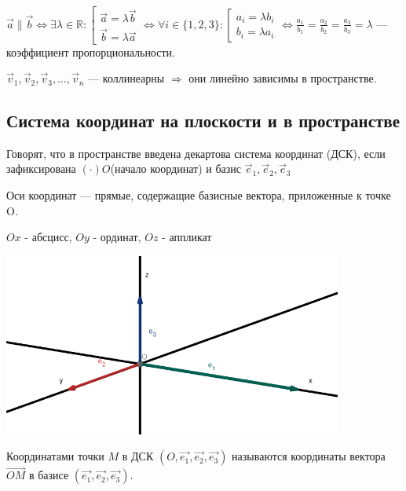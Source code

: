 \(\vec a \parallel \vec b \Leftrightarrow \exists \lambda \in \mathbb{R}:
\left[
\begin{array}{ll}
    \vec a = \lambda \vec b \\
    \vec b = \lambda \vec a
\end{array}
\right .
\Leftrightarrow
\forall i \in \{1, 2, 3\}:
\left[
\begin{array}{ll}
    a_i = \lambda b_i \\
    b_i = \lambda a_i
\end{array}
\right .
\Leftrightarrow \frac{a_1}{b_1} = \frac{a_2}{b_2} = \frac{a_3}{b_3} = \lambda\) --- коэффициент пропорциональности.

\(\vec v_1, \vec v_2, \vec v_3, \dots, \vec v_n\) --- коллинеарны \(\Rightarrow\) они линейно зависимы в пространстве.

\newpage

\subsection{Система координат на плоскости и в пространстве}

Говорят, что в пространстве введена декартова система координат (ДСК), если зафиксирована \((\cdot) O \)(начало координат) и базис \(\vec{e}_1, \vec{e}_2, \vec{e}_3\)

Оси координат --- прямые, содержащие базисные вектора, приложенные к точке O.

\(Ox\) - абсцисс, \(Oy\) - ординат, \(Oz\) - аппликат

 \begin{center}
    \includegraphics[height=6cm]{Images/Chapter_1/1-2-3.png}
 \end{center}

Координатами точки \(M\) в ДСК \((O, \vec{e_1}, \vec{e_2}, \vec{e_3})\) называются координаты вектора \(\overrightarrow{OM}\) в базисе \((\vec{e_1}, \vec{e_2}, \vec{e_3})\). 


